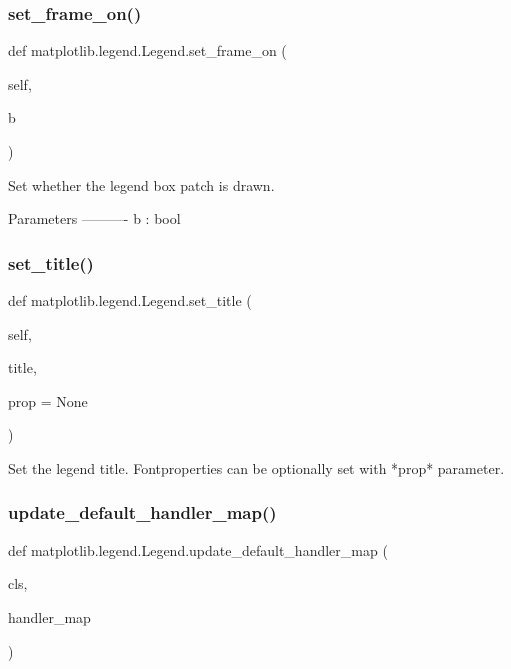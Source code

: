 \subsubsection{\texorpdfstring{set\+\_\+frame\+\_\+on()}{set\_frame\_on()}}
{\footnotesize\ttfamily def matplotlib.\+legend.\+Legend.\+set\+\_\+frame\+\_\+on (\begin{DoxyParamCaption}\item[{}]{self,  }\item[{}]{b }\end{DoxyParamCaption})}

\begin{DoxyVerb}Set whether the legend box patch is drawn.

Parameters
----------
b : bool
\end{DoxyVerb}
 \mbox{\label{classmatplotlib_1_1legend_1_1Legend_ab04806a97eb621a958331588b851454a}} 
\subsubsection{\texorpdfstring{set\+\_\+title()}{set\_title()}}
{\footnotesize\ttfamily def matplotlib.\+legend.\+Legend.\+set\+\_\+title (\begin{DoxyParamCaption}\item[{}]{self,  }\item[{}]{title,  }\item[{}]{prop = {\ttfamily None} }\end{DoxyParamCaption})}

\begin{DoxyVerb}Set the legend title. Fontproperties can be optionally set
with *prop* parameter.
\end{DoxyVerb}
 \mbox{\label{classmatplotlib_1_1legend_1_1Legend_a290bf9a76b7d56dc9f1a935d42ae68ad}} 
\subsubsection{\texorpdfstring{update\+\_\+default\+\_\+handler\+\_\+map()}{update\_default\_handler\_map()}}
{\footnotesize\ttfamily def matplotlib.\+legend.\+Legend.\+update\+\_\+default\+\_\+handler\+\_\+map (\begin{DoxyParamCaption}\item[{}]{cls,  }\item[{}]{handler\+\_\+map }\end{DoxyParamCaption})}

